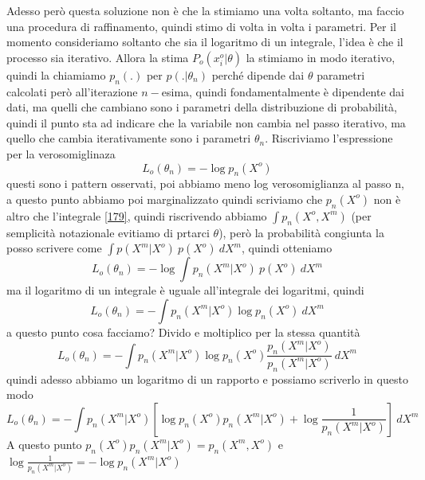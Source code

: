 \noindent Adesso però questa soluzione non è che la stimiamo una volta soltanto, ma faccio una procedura di raffinamento, quindi stimo di volta in volta i parametri. Per il momento consideriamo soltanto che sia il logaritmo di un integrale, l'idea è che il processo sia iterativo.  Allora la stima $P_o(x_i^o|\theta)$ la stimiamo in modo iterativo, quindi la chiamiamo $p_n(.)$ per $p(.|\theta_n)$ perché dipende dai $\theta$ parametri calcolati però all'iterazione $n-$esima, quindi fondamentalmente è dipendente dai dati, ma quelli che cambiano sono i parametri della distribuzione di probabilità, quindi il punto sta ad indicare che la variabile non cambia nel passo iterativo, ma quello che cambia iterativamente sono i parametri $\theta_n$. Riscriviamo l'espressione per la verosomiglinaza
\begin{equation}
L_o (\theta_n) = - \log p_n(X^o)
\end{equation}
questi sono i pattern osservati, poi abbiamo meno log verosomiglianza al passo n, a questo punto abbiamo poi marginalizzato quindi scriviamo che $p_n(X^o)$ non è altro che l'integrale \ref{179}, quindi riscrivendo abbiamo $\int p_n(X^o, X^m)$ (per semplicità notazionale evitiamo di prtarci $\theta$), però la probabilità congiunta la posso scrivere come $\int p(X^m | X^o) \ p(X^o) \ dX^m$, quindi otteniamo 
\begin{equation}
L_o (\theta_n) = -\log \int p_n(X^m | X^o) \ p(X^o) \ dX^m
\end{equation}
ma il logaritmo di un integrale è uguale all'integrale dei logaritmi, quindi
\begin{equation}
L_o (\theta_n) = -\int p_n(X^m|X^o) \log p_n(X^o) \ dX^m
\end{equation}
a questo punto cosa facciamo?  Divido e moltiplico per la stessa quantità 
\begin{equation}
L_o (\theta_n) = -\int p_n(X^m|X^o) \log p_n(X^o) \frac{p_n(X^m | X^o)}{p_n(X^m | X^o)} \ dX^m
\end{equation}
quindi adesso abbiamo un logaritmo di un rapporto e possiamo scriverlo in questo modo
\begin{equation}
L_o (\theta_n) = -\int p_n(X^m|X^o) \left[ \log p_n(X^o) p_n(X^m | X^o) + \log \frac{1}{p_n(X^m | X^o)} \right] \ dX^m
\end{equation}
A questo punto $p_n(X^o) p_n(X^m | X^o) = p_n(X^m, X^o)$ e $\log \frac{1}{p_n(X^m | X^o)} = - \log p_n(X^m | X^o)$ 
